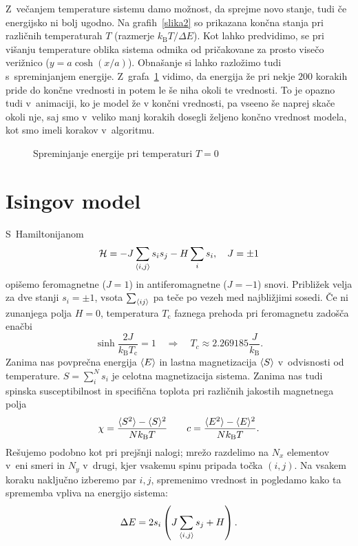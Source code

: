 \documentclass[a4paper,pdftex,10pt]{article}
\DeclarePairedDelimiter{\evdel}{\langle}{\rangle}   %
\numberwithin{figure}{section} %
\begin{document}
Z~večanjem temperature sistemu damo možnost, da sprejme novo stanje, tudi če energijsko ni
bolj ugodno. Na grafih~\ref{slika2} so prikazana končna stanja pri različnih 
temperaturah $T$ (razmerje $k_{\text{B}} T/\Delta E$). Kot lahko predvidimo, se pri višanju 
temperature oblika sistema odmika od pričakovane za prosto visečo verižnico ($y = a \cosh 
(x/a)$). 
Obnašanje si lahko razložimo tudi s~spreminjanjem energije. Z~grafa~\ref{slika4} vidimo,
da energija že pri nekje $200$ korakih pride do končne vrednosti in potem le še niha
okoli te vrednosti. To je opazno tudi v~animaciji, ko je model že v končni vrednosti,
pa vseeno še naprej skače okoli nje, saj smo v~veliko manj korakih dosegli željeno končno
vrednost modela, kot smo imeli korakov v~algoritmu.
\begin{figure}    
    \centering 
    \resizebox{0.93\linewidth}{!}{} 
    \caption{Spreminjanje energije pri temperaturi $T=0$} 
    \label{slika4}
\end{figure}


\pagebreak

\section{Isingov model}
S~Hamiltonijanom
\begin{equation}
    \mathcal{H} = -J \sum_{\evdel{i,j}}s_i s_j - H \sum_i s_i, \quad J=\pm 1
\end{equation}
opišemo feromagnetne ($J=1$) in antiferomagnetne ($J=-1$) snovi. Približek velja za dve 
stanji $s_i = \pm 1$, vsota $\sum_{\evdel{ij}}$ pa teče po vezeh med najbližjimi sosedi. 
Če ni zunanjega polja $H=0$, temperatura $T_{\text{c}}$ faznega prehoda pri feromagnetu 
zadošča enačbi 
\begin{equation}
    \sinh \frac{2J}{k_{\text{B}} T_{\text{c}}} = 1 \quad \Longrightarrow \quad
    T_c \approx 2.269185 \frac{J}{k_{\text{B}}}.
\end{equation}
Zanima nas povprečna energija $\evdel{E}$ in lastna magnetizacija $\evdel{S}$ v~odvisnosti
od temperature. $S = \sum_i^N s_i$ je celotna magnetizacija sistema. Zanima nas tudi 
spinska susceptibilnost in specifična toplota pri različnih jakostih magnetnega polja
\begin{equation}
    \chi = \frac{ \evdel{S^2} - \evdel{S}^2}{N k_{\text{B}} T} \qquad
    c = \frac{ \evdel{E^2} - \evdel{E}^2}{N k_{\text{B}} T}.
\end{equation}
Rešujemo podobno kot pri prejšnji nalogi; mrežo razdelimo na $N_x$ elementov v~eni smeri
in $N_y$ v~drugi, kjer vsakemu spinu pripada točka $(i,j)$. Na vsakem koraku naključno
izberemo par $i,j$, spremenimo vrednost in pogledamo kako ta sprememba vpliva na energijo 
sistema:
\begin{equation}
    \Delta E = 2 s_i \left( J \sum_{\evdel{i,j}} s_j + H \right).
\end{equation}
\end{document}
